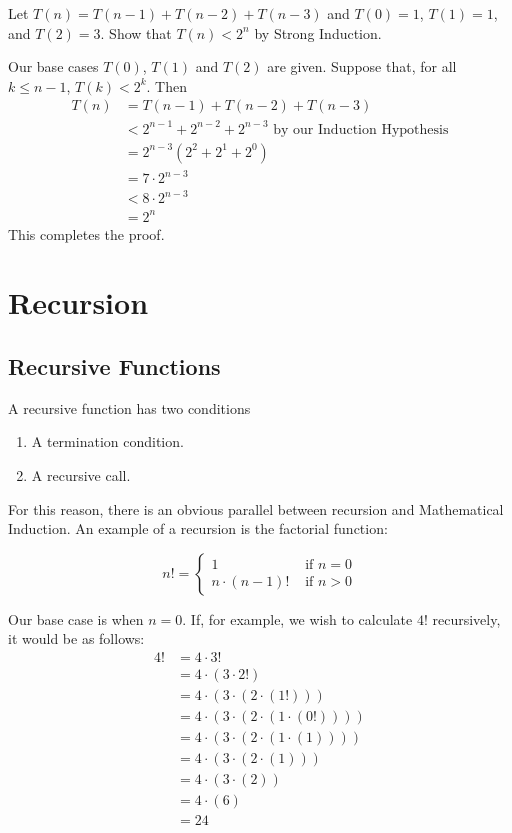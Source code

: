 \begin{exercise}{}{}
    Let $T(n) = T(n-1) + T(n-2) + T(n-3)$ and $T(0)=1$, $T(1)=1$, and $T(2)=3$. Show that $T(n)<2^n$ by Strong Induction.
\end{exercise}
\begin{solution}
    Our base cases $T(0)$, $T(1)$ and $T(2)$ are given. Suppose that, for all $k\leq n-1$, $T(k)<2^k$. Then
    \begin{align*}
        T(n) & =T(n-1)+T(n-2)+T(n-3)                                       \\
             & <2^{n-1}+2^{n-2}+2^{n-3}\text{ by our Induction Hypothesis} \\
             & =2^{n-3}(2^2+2^1+2^0)                                       \\
             & =7\cdot2^{n-3}                                              \\
             & <8\cdot2^{n-3}                                              \\
             & =2^n
    \end{align*}
    This completes the proof.
\end{solution}

\section{Recursion}
\subsection{Recursive Functions}
A recursive function has two conditions
\begin{enumerate}
    \item A termination condition.
    \item A recursive call.
\end{enumerate}

For this reason, there is an obvious parallel between recursion and Mathematical Induction. An example of a recursion is the factorial function:

\[n! = \begin{cases}
        1            & \text{ if }n=0  \\
        n\cdot(n-1)! & \text{ if } n>0
    \end{cases}\]

Our base case is when $n=0$. If, for example, we wish to calculate $4!$ recursively, it would be as follows:
\begin{align*}4!&=4\cdot3!\\&=4\cdot(3\cdot2!)\\&=4\cdot(3\cdot(2\cdot(1!)))\\&=4\cdot(3\cdot(2\cdot(1\cdot(0!))))\\&=4\cdot(3\cdot(2\cdot(1\cdot(1))))\\&=4\cdot(3\cdot(2\cdot(1)))\\&=4\cdot(3\cdot(2))\\&=4\cdot(6)\\&=24\end{align*}

